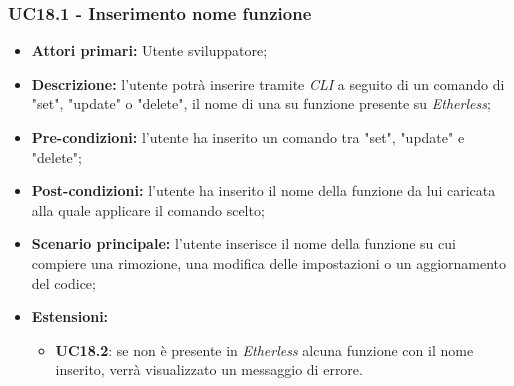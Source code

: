 \subsubsection{UC18.1 - Inserimento nome funzione}
\begin{itemize}
	\item \textbf{Attori primari:} Utente sviluppatore;
	\item \textbf{Descrizione:} l'utente potrà inserire tramite \textit{CLI\glos} a seguito di un comando di "set", "update" o "delete", il nome di una su funzione presente su \textit{Etherless}; 
	\item \textbf{Pre-condizioni:} l'utente ha inserito un comando tra "set", "update" e "delete";
	\item \textbf{Post-condizioni:} l'utente ha inserito il nome della funzione da lui caricata alla quale applicare il comando scelto;
	\item \textbf{Scenario principale:} l'utente inserisce il nome della funzione su cui compiere una rimozione, una modifica delle impostazioni o un aggiornamento del codice;
	\item \textbf{Estensioni:} 
	\begin{itemize}
		\item \textbf{UC18.2}: se non è presente in \textit{Etherless} alcuna funzione con il nome inserito, verrà visualizzato un messaggio di errore.
	\end{itemize}
\end{itemize}